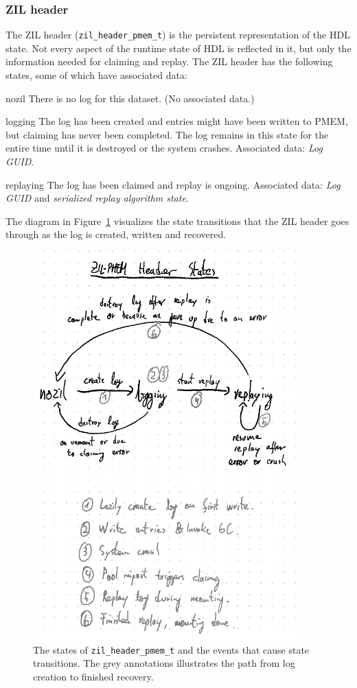 \documentclass[12pt,a4paper,twoside]{book}
\begin{document}
\subsubsection{ZIL header}
The ZIL header (\lstinline{zil_header_pmem_t}) is the persistent representation of the HDL state.
Not every aspect of the runtime state of HDL is reflected in it, but only the information needed for claiming and replay.
The ZIL header has the following states, some of which have associated data:
\begin{description}[noitemsep,leftmargin=1.5cm,labelindent=1cm]
    \item[nozil] There is no log for this dataset. (No associated data.)
    \item[logging] The log has been created and entries might have been written to PMEM, but claiming has never been completed.
        The log remains in this state for the entire time until it is destroyed or the system crashes. Associated data: \textit{Log GUID}.
    \item[replaying] The log has been claimed and replay is ongoing. Associated data: \textit{Log GUID} and \textit{serialized replay algorithm state}.
\end{description}
The diagram in Figure~\ref{fig:prb_persistent_structure__header_states_plus_example} visualizes the state transitions that the ZIL header goes through as the log is created, written and recovered.

\begin{figure}
    \includegraphics[height=15cm]{fig/prb_persistent_structure__header_states_plus_example}
    \caption{
        The states of \lstinline{zil_header_pmem_t} and the events that cause state transitions.
        The grey annotations illustrates the path from log creation to finished recovery.}
    \label{fig:prb_persistent_structure__header_states_plus_example}
\end{figure}
\end{document}
